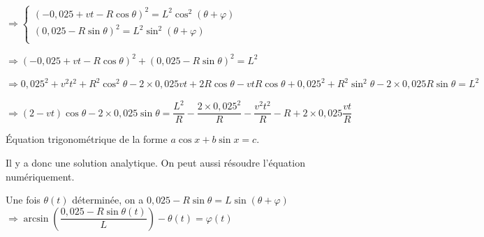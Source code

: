 \begin{corrigebox}
$\Rightarrow 
\left\{
\begin{array}{l}
\left(-0,025+vt- R\cos\theta\right)^2  =L^2\cos^2\left(\theta+\varphi\right)  \\
\left(0,025 - R \sin\theta  \right)^2= L^2\sin^2\left(\theta+\varphi\right)\\
\end{array}
\right.
$

$\Rightarrow 
\left(-0,025+vt- R\cos\theta\right)^2  + \left(0,025 - R \sin\theta  \right)^2 = L^2
$

$\Rightarrow 
0,025^2+v^2t^2+R^2\cos^2\theta -2\times 0,025 vt+2R\cos\theta-vtR\cos\theta
  + 0,025^2 + R^2 \sin^2\theta -2\times 0,025 R \sin\theta  =      L^2
$

$\Rightarrow 
\left(2-vt\right)\cos\theta  -2\times 0,025  \sin\theta  =      \dfrac{L^2}{R} - \dfrac{2\times0,025^2}{R}-\dfrac{v^2t^2}{R}-R +2\times 0,025 \dfrac{vt}{R}
$

Équation trigonométrique de la forme $a\cos x  + b\sin x =c$.

Il y a donc une solution analytique. On peut aussi résoudre l'équation numériquement.

Une fois $\theta(t)$ déterminée, on a $0,025 - R \sin\theta  = L\sin\left(\theta+\varphi\right)$ 
$\Rightarrow \arcsin\left(\dfrac{0,025 - R \sin\theta(t)}{L}\right)  - \theta(t) = \varphi(t)$
\end{corrigebox}
